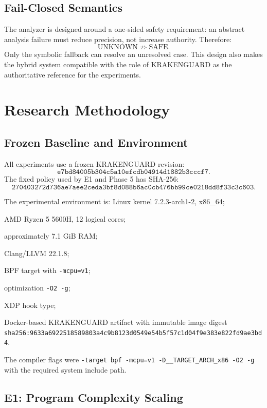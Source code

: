 \documentclass[12pt,a4paper]{article}
\begin{document}
\subsection{Fail-Closed Semantics}

The analyzer is designed around a one-sided safety requirement: an abstract analysis failure must reduce precision, not increase authority. Therefore:
\[
    \mathrm{UNKNOWN} \not\Rightarrow \mathrm{SAFE}.
\]
Only the symbolic fallback can resolve an unresolved case. This design also makes the hybrid system compatible with the role of KRAKENGUARD as the authoritative reference for the experiments.

\section{Research Methodology}

\subsection{Frozen Baseline and Environment}

All experiments use a frozen KRAKENGUARD revision:
\[
\texttt{e7bd84005b304c5a10efcdb04914d1882b3cccf7}.
\]
The fixed policy used by E1 and Phase 5 has SHA-256:
\[
\texttt{270403272d736ae7aee2ceda3bf8d088b6ac0cb476bb99ce0218dd8f33c3c603}.
\]

The experimental environment is:
\noindent Linux kernel 7.2.3-arch1-2, x86\_64;

\noindent AMD Ryzen 5 5600H, 12 logical cores;

\noindent approximately 7.1 GiB RAM;

\noindent Clang/LLVM 22.1.8;

\noindent BPF target with \texttt{-mcpu=v1};

\noindent optimization \texttt{-O2 -g};

\noindent XDP hook type;

\noindent Docker-based KRAKENGUARD artifact with immutable image digest \texttt{sha256:9633a6922518589803a4c9b8123d0549e54b5f57c1d04f9e383e822fd9ae3bd4}.

The compiler flags were \texttt{-target bpf -mcpu=v1 -D\_\_TARGET\_ARCH\_x86 -O2 -g} with the required system include path.

\subsection{E1: Program Complexity Scaling}
\end{document}
